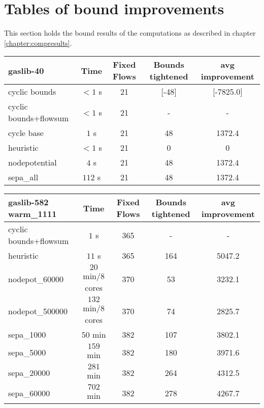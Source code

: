\section{Tables of bound improvements}
\label{appendix:boundimprove}
This section holds the bound results of the computations as described in chapter \ref{chapter:compresults}.

\begin{center}
\begin{tabular}{ l | c | c | c | c }
\textbf{gaslib-40} & Time  & Fixed Flows & Bounds tightened & avg improvement\\
\hline
 cyclic bounds& $<1$ s& 21 & [-48] & [-7825.0] \\
 cyclic bounds+flowsum& $<1$ s& 21 & - & - \\
 cycle base& $1$ s & 21 & 48 & 1372.4\\
 heuristic& $<1$ s& 21& 0 & 0\\
 nodepotential& $4$ s& 21 & 48 & 1372.4 \\ 
 sepa\_all& $112$ s& 21 & 48 & 1372.4\\
\end{tabular} 
\end{center}

\begin{center}
\begin{tabular}{ l | c | c | c | c }
\textbf{gaslib-582 warm\_1111} & Time  & Fixed Flows & Bounds tightened & avg improvement \\
\hline
 cyclic bounds+flowsum& $1$ s& 365 & - & -\\
 heuristic& $ 11$ s& 365& 164 & 5047.2 \\
 nodepot\_60000& $20$ min/8 cores &370  &53  &3232.1   \\ 
 nodepot\_500000& $132$ min/8 cores & 370 & 74 & 2825.7  \\ 
 sepa\_1000& $ 50$ min & 382 & 107 & 3802.1 \\
 sepa\_5000& $ 159$ min & 382 & 180 & 3971.6 \\
 sepa\_20000& $ 281$ min & 382 & 264 & 4312.5 \\
 sepa\_60000& $702$ min  & 382& 278& 4267.7\\
\end{tabular} 
\end{center}

